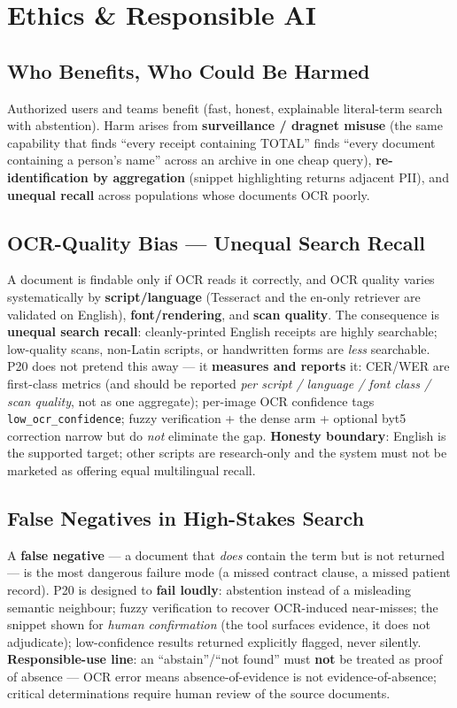 \documentclass[12pt,a4paper]{article}
\begin{document}
\section{Ethics \& Responsible AI}

\subsection{Who Benefits, Who Could Be Harmed}

Authorized users and teams benefit (fast, honest, explainable literal-term search with abstention). Harm arises from \textbf{surveillance / dragnet misuse} (the same capability that finds ``every receipt containing TOTAL'' finds ``every document containing a person's name'' across an archive in one cheap query), \textbf{re-identification by aggregation} (snippet highlighting returns adjacent PII), and \textbf{unequal recall} across populations whose documents OCR poorly.

\subsection{OCR-Quality Bias --- Unequal Search Recall}

A document is findable only if OCR reads it correctly, and OCR quality varies systematically by \textbf{script/language} (Tesseract and the en-only retriever are validated on English), \textbf{font/rendering}, and \textbf{scan quality}. The consequence is \textbf{unequal search recall}: cleanly-printed English receipts are highly searchable; low-quality scans, non-Latin scripts, or handwritten forms are \emph{less} searchable. P20 does not pretend this away --- it \textbf{measures and reports} it: CER/WER are first-class metrics (and should be reported \emph{per script / language / font class / scan quality}, not as one aggregate); per-image OCR confidence tags \texttt{low\_ocr\_confidence}; fuzzy verification + the dense arm + optional byt5 correction narrow but do \emph{not} eliminate the gap. \textbf{Honesty boundary}: English is the supported target; other scripts are research-only and the system must not be marketed as offering equal multilingual recall.

\subsection{False Negatives in High-Stakes Search}

A \textbf{false negative} --- a document that \emph{does} contain the term but is not returned --- is the most dangerous failure mode (a missed contract clause, a missed patient record). P20 is designed to \textbf{fail loudly}: abstention instead of a misleading semantic neighbour; fuzzy verification to recover OCR-induced near-misses; the snippet shown for \emph{human confirmation} (the tool surfaces evidence, it does not adjudicate); low-confidence results returned explicitly flagged, never silently. \textbf{Responsible-use line}: an ``abstain''/``not found'' must \textbf{not} be treated as proof of absence --- OCR error means absence-of-evidence is not evidence-of-absence; critical determinations require human review of the source documents.
\end{document}
